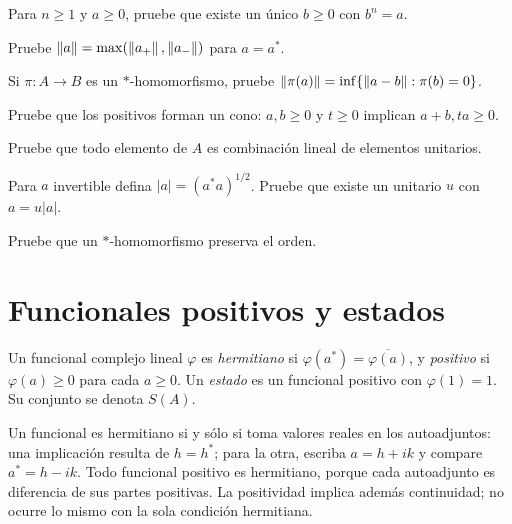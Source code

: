 \begin{ejercicio}\label{ej:v3-l27-1}
Para $n\ge1$ y $a\ge0$, pruebe que existe un único $b\ge0$ con $b^n=a$.
\end{ejercicio}


\begin{ejercicio}\label{ej:v3-l27-2}
Pruebe $\left\lVert a\right\rVert=\max(\left\lVert a_+\right\rVert,\left\lVert a_-\right\rVert)$ para $a=a^*$.
\end{ejercicio}


\begin{ejercicio}\label{ej:v3-l27-3}
Si $\pi:A\to B$ es un $*$-homomorfismo, pruebe $\left\lVert\pi(a)\right\rVert=\inf\{\left\lVert a-b\right\rVert:\pi(b)=0\}$.
\end{ejercicio}


\begin{ejercicio}\label{ej:v3-l27-4}
Pruebe que los positivos forman un cono: $a,b\ge0$ y $t\ge0$ implican $a+b,ta\ge0$.
\end{ejercicio}


\begin{ejercicio}\label{ej:v3-l27-5}
Pruebe que todo elemento de $A$ es combinación lineal de elementos unitarios.
\end{ejercicio}


\begin{ejercicio}\label{ej:v3-l27-6}
Para $a$ invertible defina $|a|=(a^*a)^{1/2}$. Pruebe que existe un unitario $u$ con $a=u|a|$.
\end{ejercicio}


\begin{ejercicio}\label{ej:v3-l27-7}
Pruebe que un $*$-homomorfismo preserva el orden.
\end{ejercicio}


\section{Funcionales positivos y estados}\label{lec:v3-28}

\begin{definicion}
Un funcional complejo lineal $\varphi$ es \emph{hermitiano} si $\varphi(a^*)=\overline{\varphi(a)}$, y \emph{positivo} si $\varphi(a)\ge0$ para cada $a\ge0$. Un \emph{estado} es un funcional positivo con $\varphi(1)=1$. Su conjunto se denota $S(A)$.
\end{definicion}

Un funcional es hermitiano si y sólo si toma valores reales en los autoadjuntos: una implicación resulta de $h=h^*$; para la otra, escriba $a=h+ik$ y compare $a^*=h-ik$. Todo funcional positivo es hermitiano, porque cada autoadjunto es diferencia de sus partes positivas. La positividad implica además continuidad; no ocurre lo mismo con la sola condición hermitiana.

